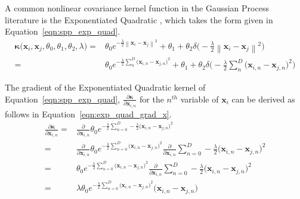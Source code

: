 A common nonlinear covariance kernel function in the Gaussian Process literature 
is the Exponentiated Quadratic \cite{EXPQUAD}, which takes the form given in 
Equation~\ref{eqn:spp_exp_quad}.
\begin{align}
  \label{eqn:spp_exp_quad}
  \bm{\kappa} \big( \bm{x}_{i}, \bm{x}_{j}, \theta_{0}, 
  \theta_{1}, \theta_{2}, \lambda \big) ={}&
  \theta_{0} e^{-\frac{\lambda}{2} 
  \left\lVert \bm{x}_{i} - \bm{x}_{j} \right\rVert^{2}}
  + \theta_{1} + \theta_{2} \delta \big( -\frac{\lambda}{2} 
  \left\lVert \bm{x}_{i} - \bm{x}_{j} \right\rVert^{2} \big)\\
  =& \theta_{0} e^{-\frac{\lambda}{2} 
  \sum_{n}^{D} {\big( \bm{x}_{i, n} - \bm{x}_{j, n} \big)}^{2}}
  + \theta_{1} + \theta_{2} \delta \big( -\frac{\lambda}{2} 
  \sum_{n}^{D} {\big( \bm{x}_{i, n} - \bm{x}_{j, n} \big)}^{2} \big)
\end{align}

The gradient of the Exponentiated Quadratic kernel of Equation~\ref{eqn:spp_exp_quad},
\( \frac{\partial \bm{\kappa}}{\partial \bm{x}_{i, n}} \) for the \( n^{th} \) variable 
of \( \bm{x}_{i} \) can be derived as follows in Equation~\ref{eqn:exp_quad_grad_x}.
\begin{align}
  \label{eqn:exp_quad_grad_x}
  \frac{\partial \bm{\kappa}}{\partial \bm{x}_{i, n}} ={}& 
  \frac{\partial}{\partial \bm{x}_{i, n}} \theta_{0} e^{-\frac{\lambda}{2} 
  \sum_{n = 0}^{D} -\frac{\lambda}{2} {\big( \bm{x}_{i, n} - \bm{x}_{j, n} \big)}^{2}}\\
  =& \frac{\partial}{\partial \bm{x}_{i, n}} \theta_{0} e^{-\frac{\lambda}{2} 
  \sum_{n = 0}^{D} {\big( \bm{x}_{i, n} - \bm{x}_{j, n} \big)}^{2}} 
  \frac{\partial}{\partial \bm{x}_{i, n}} \sum_{n = 0}^{D} -\frac{\lambda}{2} 
  {\big( \bm{x}_{i, n} - \bm{x}_{j, n} \big)}^{2}\\
  =& \theta_{0} e^{-\frac{\lambda}{2} 
  \sum_{n = 0}^{D} {\big( \bm{x}_{i, n} - \bm{x}_{j, n} \big)}^{2}} 
  \frac{\partial}{\partial \bm{x}_{i, n}} \sum_{n = 0}^{D} -\frac{\lambda}{2} 
  {\big( \bm{x}_{i, n} - \bm{x}_{j, n} \big)}^{2}\\
  =& \lambda \theta_{0} e^{-\frac{\lambda}{2} 
  \sum_{n = 0}^{D} {\big( \bm{x}_{i, n} - \bm{x}_{j, n} \big)}^{2}} 
  {\big( \bm{x}_{i, n} - \bm{x}_{j, n} \big)}
\end{align}

